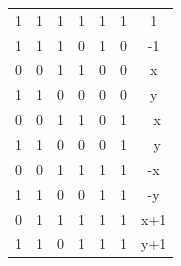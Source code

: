 \documentclass[12pt]{report}
\begin{document}
\begin{table}[H]
\begin{tabular}{|C|C|C|C|C|C|C|}
    1                                                & 1                                               & 1                          & 1                          & 1                                          & 1          & 1        \\
    1                                                & 1                                               & 1                          & 0                          & 1                                          & 0          & -1       \\
    0                                                & 0                                               & 1                          & 1                          & 0                                          & 0          & x        \\
    1                                                & 1                                               & 0                          & 0                          & 0                                          & 0          & y        \\
    0                                                & 0                                               & 1                          & 1                          & 0                                          & 1          & ~x       \\
    1                                                & 1                                               & 0                          & 0                          & 0                                          & 1          & ~y       \\
    0                                                & 0                                               & 1                          & 1                          & 1                                          & 1          & -x       \\
    1                                                & 1                                               & 0                          & 0                          & 1                                          & 1          & -y       \\
    0                                                & 1                                               & 1                          & 1                          & 1                                          & 1          & x+1      \\
    1                                                & 1                                               & 0                          & 1                          & 1                                          & 1          & y+1      \\

\end{tabular}
\end{table}
\end{document}
